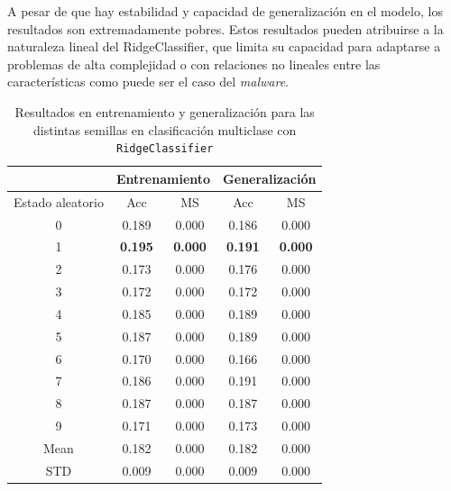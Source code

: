 \vspace{1em}

A pesar de que hay estabilidad y capacidad de generalización en el modelo, los resultados son extremadamente pobres. Estos resultados pueden atribuirse a la naturaleza lineal del RidgeClassifier, que limita su capacidad para adaptarse a problemas de alta complejidad o con relaciones no lineales entre las características como puede ser el caso del \textit{malware}.

\begin{table}[H]
	\centering
	\begin{tabular}{ |c|c|c|c|c| }
		\hline
		\rowcolor{LightCyan}
		 & \multicolumn{2}{c|}{Entrenamiento} & \multicolumn{2}{c|}{Generalización} \\
		\hline
		\rowcolor{LightCyan}
		 Estado aleatorio & Acc & MS & Acc & MS \\
		\hline
		0    & 0.189          & 0.000          & 0.186          & 0.000          \\
		1    & \textbf{0.195} & \textbf{0.000} & \textbf{0.191} & \textbf{0.000} \\
		2    & 0.173          & 0.000          & 0.176          & 0.000          \\
		3    & 0.172          & 0.000          & 0.172          & 0.000          \\
		4    & 0.185          & 0.000          & 0.189          & 0.000          \\
		5    & 0.187          & 0.000          & 0.189          & 0.000          \\
		6    & 0.170          & 0.000          & 0.166          & 0.000          \\
		7    & 0.186          & 0.000          & 0.191          & 0.000          \\
		8    & 0.187          & 0.000          & 0.187          & 0.000          \\
		9    & 0.171          & 0.000          & 0.173          & 0.000          \\
		Mean & 0.182          & 0.000          & 0.182          & 0.000          \\
		STD  & 0.009          & 0.000          & 0.009          & 0.000          \\
		\hline
	\end{tabular}
	\caption{Resultados en entrenamiento y generalización para las distintas semillas en clasificación multiclase con \texttt{RidgeClassifier}}
	\label{tabla:ridge_multi}
\end{table}

